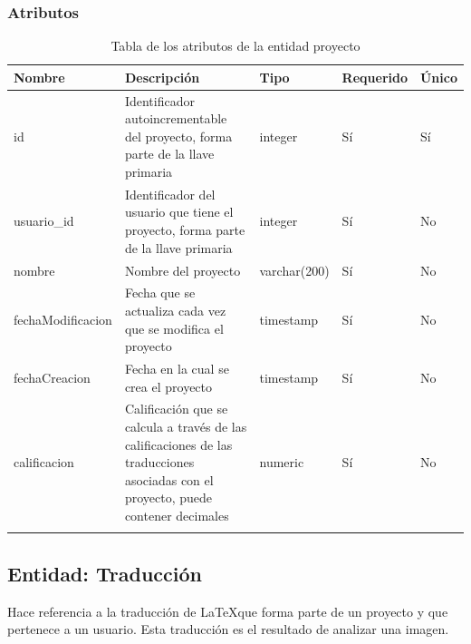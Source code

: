 \subsubsection{Atributos}
\begin{center}
	\begin{longtable}{|J{3cm}|J{4cm}|J{3cm}|J{2cm}|J{2cm}|}
		\hline
		\textbf{Nombre} & \textbf{Descripción} & \textbf{Tipo} & \textbf{Requerido} & \textbf{Único} \\ \hline
		id & Identificador autoincrementable del proyecto, forma parte de la llave primaria & integer & Sí & Sí \\ \hline
		usuario\_id & Identificador del usuario que tiene el proyecto, forma parte de la llave primaria & integer & Sí & No \\ \hline
		nombre & Nombre del proyecto & varchar(200) & Sí & No \\ \hline
		fechaModificacion & Fecha que se actualiza cada vez que se modifica el proyecto & timestamp & Sí & No \\ \hline
		fechaCreacion & Fecha en la cual se crea el proyecto & timestamp & Sí & No \\ \hline
		calificacion & Calificación que se calcula a través de las calificaciones de las traducciones asociadas con el proyecto, puede contener decimales & numeric & Sí & No \\ \hline
		\caption{Tabla de los atributos de la entidad proyecto}
		\label{tbl:entidad-proyecto}
	\end{longtable}
\end{center}
\subsection{Entidad: Traducción}
Hace referencia a la traducción de \LaTeX que forma parte de un proyecto y que pertenece a un usuario. Esta traducción es el resultado de analizar una imagen.
